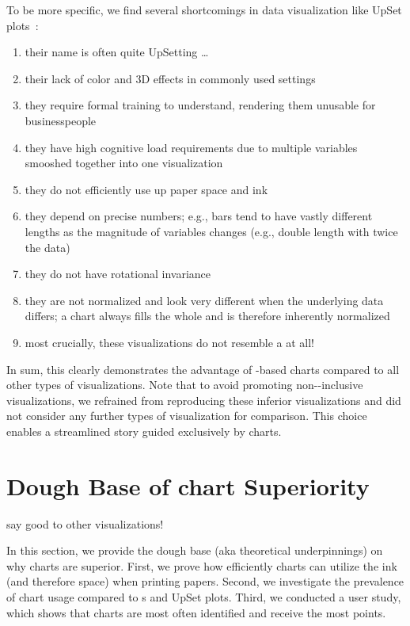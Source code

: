 \documentclass[11pt,letterpaper]{article}
\def\pie{}%
\newcommand{\pie}{{\fontspec{Symbola}\char"1F967}}
\begin{document}
\noindent
To be  more specific, we find several shortcomings in data visualization like UpSet plots~\cite{lex2014upset}:
\begin{enumerate}
    \item their name is often quite UpSetting \ldots
    \item their lack of color and 3D effects in commonly used settings
    \item they require formal training to understand, rendering them unusable for businesspeople
    \item they have high cognitive load requirements due to multiple variables smooshed together into one visualization
    \item they do not efficiently use up paper space and ink
    \item they depend on precise numbers; e.g., bars tend to have vastly different lengths as the magnitude of variables changes (e.g., double length with twice the data)
    \item they do not have rotational invariance
    \item they are not normalized and look very different when the underlying data differs; a \pie{}chart always fills the whole \pie{} and is therefore inherently normalized 
    \item most crucially, these visualizations do not resemble a \pie{} at all!
\end{enumerate}

\noindent
In sum, this clearly demonstrates the advantage of \pie{}-based charts compared to all other types of visualizations. Note that to avoid promoting non-\pie{}-inclusive visualizations, we  refrained from reproducing these inferior visualizations and did not consider any further types of visualization for comparison. This choice enables a streamlined story guided exclusively by \pie{}charts.


\section{Dough Base of \pie{}chart Superiority}
\epigraph{say good\pie{} to other visualizations!}{}
\noindent
In this section, we provide the dough base (aka theoretical underpinnings) on why \pie{}charts are superior. First, we prove how efficiently \pie{}charts can utilize the ink (and therefore space) when printing papers. Second, we investigate the prevalence of \pie{}chart usage compared to \venn{}s and UpSet plots. Third, we conducted a user study, which shows that \pie{}charts are most often identified and receive the most points.
\end{document}

